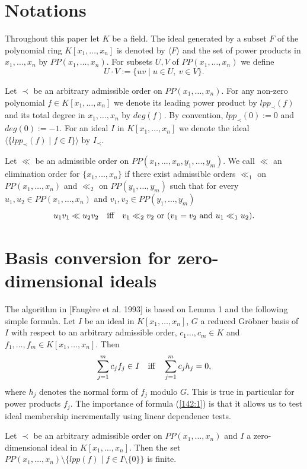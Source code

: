 \section{Notations}
Throughout this paper let $K$ be a field.
The ideal generated by a subset $F$ of the polynomial ring
$K[x_1,\ldots,x_n]$
is denoted by $\langle F\rangle$
and the set of power products in $x_1,\ldots,x_n$ by 
$PP(x_1,\ldots,x_n)$. For subsets $U,V$ of $PP(x_1,\ldots,x_n)$ we define
\[ U\cdot V:=\{uv\mid u\in U,~v\in V\}. \]

Let $\prec$ be an arbitrary
admissible order on
$PP(x_1,\ldots,x_n)$. 
For any non-zero 
polynomial $f\in K[x_1,\ldots,x_n]$ we denote its leading power product by
$lpp_{\prec}(f)$ and its total degree in $x_1,\ldots,x_n$ by $deg(f)$.
By convention, $lpp_{\prec}(0):=0$ and $deg(0):=-1$.
For an ideal $I$ in $K[x_1,\ldots,x_n]$ we denote the ideal 
$\langle \{lpp_{\prec}(f)\mid f\in I\}\rangle$ by $I_{\prec}$. 

Let $\ll$ be an admissible order on $PP(x_1,\ldots,x_n,y_1,\ldots,y_m)$. 
We call $\ll$ an elimination  order for $\{x_1,\ldots,x_n\}$ if there 
exist admissible orders $\ll_1$ on $PP(x_1,\ldots,x_n)$
and $\ll_2$ on
$PP(y_1,\ldots,y_m)$ such that for every 
$u_1,u_2\in PP(x_1,\ldots,x_n)$ and $v_1,v_2\in PP(y_1,\ldots,y_m)$
\[ u_1v_1\ll u_2v_2\ \ \hbox{ iff }\ \  v_1\ll_2 v_2 \hbox{ or }
(v_1=v_2 \hbox{ and } u_1\ll_1 u_2). \]

\section{Basis conversion for zero-dimensional ideals}
The algorithm in [Faug{\`e}re et al. 1993] is based on 
Lemma 1 and the following
simple formula. Let $I$ be an ideal in $K[x_1,\ldots,x_n]$,
$G$ a reduced Gr\"obner basis of $I$ with respect to an arbitrary admissible
order, $c_1\ldots,c_m\in K$ and $f_1,\ldots,f_m\in K[x_1,\ldots,x_n]$. Then
\begin{equation}
\sum_{j=1}^m c_j f_j\in I \ \ \hbox{ iff }\ \ \sum_{j=1}^m c_j h_j=0,
\label{142:1}
\end{equation}
where $h_j$ denotes the normal form of $f_j$ modulo $G$. This is true in
particular for power products $f_j$. The importance of formula (\ref{142:1})
is that it allows us to test ideal membership incrementally using
linear dependence tests.

\medskip
\begin{lemma}
Let $\prec$ be an arbitrary admissible order on $PP(x_1,\ldots,x_n)$ and
$I$ a zero-dimensional ideal in $K[x_1,\ldots,x_n]$. Then the set
$PP(x_1,\ldots,x_n)\setminus \{lpp(f)\mid f\in I\setminus\{0\}\}$ is finite.
\end{lemma}



